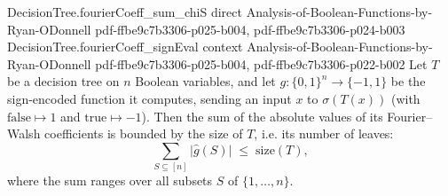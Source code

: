 \begin{theorem}
\proofstep
  {DecisionTree.fourierCoeff_sum_chiS}
  {direct}
  {Analysis-of-Boolean-Functions-by-Ryan-ODonnell}
  {pdf-ffbe9c7b3306-p025-b004,
    pdf-ffbe9c7b3306-p024-b003}
\proofstep
  {DecisionTree.fourierCoeff_signEval}
  {context}
  {Analysis-of-Boolean-Functions-by-Ryan-ODonnell}
  {pdf-ffbe9c7b3306-p025-b004,
    pdf-ffbe9c7b3306-p022-b002}
Let $T$ be a decision tree on $n$ Boolean variables, and let $g : \{0,1\}^n \to
\{-1,1\}$ be the sign-encoded function it computes, sending an input $x$ to
$\sigma(T(x))$ (with $\mathrm{false}\mapsto 1$ and $\mathrm{true}\mapsto -1$). Then the
sum of the absolute values of its Fourier--Walsh coefficients is bounded by the size of
$T$, i.e. its number of leaves:
\[
  \sum_{S \subseteq [n]} \bigl|\hat g(S)\bigr| \;\le\; \mathrm{size}(T),
\]
where the sum ranges over all subsets $S$ of $\{1,\dots,n\}$.
\end{theorem}

